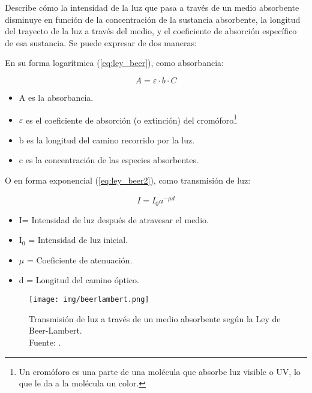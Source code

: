 Describe cómo la intensidad de la luz que pasa a través de un medio absorbente disminuye en función de la concentración de la sustancia absorbente, la longitud del trayecto de la luz a través del medio, y el coeficiente de absorción específico de esa sustancia. Se puede expresar de dos maneras:

En su forma logarítmica (\ref{eq:ley_beer}), como absorbancia:

\begin{equation}
    A = \varepsilon \cdot b \cdot C 
    \label{eq:ley_beer}
\end{equation}


\begin{itemize}
    \item A es la absorbancia.
    \item $\varepsilon$ es el coeficiente de absorción (o extinción) del cromóforo\footnote{Un cromóforo es una parte de una molécula que absorbe luz visible o UV, lo que le da a la molécula un color.}
    \item b es la longitud del camino recorrido por la luz. 
    \item c es la concentración de las especies absorbentes. 
\end{itemize}

\newpage

O en forma exponencial (\ref{eq:ley_beer2}), como transmisión de luz:

\begin{equation}
    I = I_0 a^{-\mu \dot{d}} 
    \label{eq:ley_beer2}
\end{equation}

\begin{itemize}
    \item I= Intensidad de luz después de atravesar el medio.
    \item I$_0$ = Intensidad de luz inicial.
    \item $\mu$ = Coeficiente de atenuación. 
    \item d = Longitud del camino óptico.
\end{itemize}


\begin{figure}[H]
    \centering
    \texttt{[image: img/beerlambert.png]}
    \caption{Transmisión de luz a través de un medio absorbente según la Ley de Beer-Lambert. 
    \\ Fuente: \cite{Cordido2023}.}
    \label{fig:beerlambert}
\end{figure}

